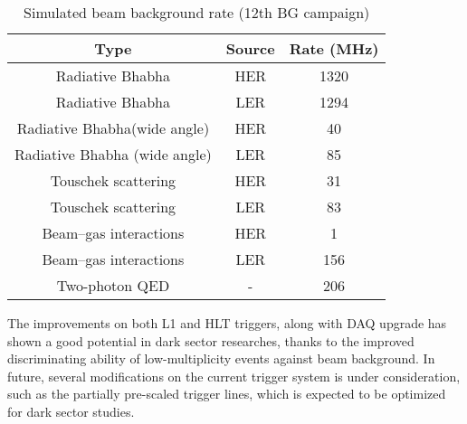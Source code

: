 \begin{table}[htbp]
	\centering
	\large
	\caption{Simulated beam background rate (12th BG campaign)\cite{b2book}}
	\label{tab:BG}
	\begin{tabular}{c c c}
		\toprule
		Type & Source & Rate (MHz)\\
		\hline
		Radiative Bhabha & HER &  1320\\
		Radiative Bhabha & LER &  1294\\
		Radiative Bhabha(wide angle) & HER &  40\\
		Radiative Bhabha (wide angle) & LER &  85\\
		Touschek scattering & HER &  31\\
		Touschek scattering & LER &  83\\
		Beam–gas interactions & HER &  1\\
		Beam–gas interactions & LER &  156\\
		Two-photon QED & - & 206\\
		\bottomrule
	\end{tabular}
\end{table}

The improvements on both L1 and HLT triggers, along with DAQ upgrade has shown a good potential in dark sector researches\cite{de2018first}\cite{macqueen2020dark}, thanks to the improved discriminating ability of low-multiplicity events against beam background. In future, several modifications on the current trigger system is under consideration, such as the partially pre-scaled trigger lines, which is expected to be optimized for dark sector studies\cite{b2book}. 


\begin{comment}
Based on the reasons discussed above, Belle II trigger has been designed to have 2 separated levels of triggers. Low level trigger, also called as L1 trigger, is hardware-based trigger. and high level trigger (HLT) is the software based trigger.
The L1 trigger rate can go up to 30kHz that is also the up-limit of DAQ read-in rate. The latency of L1 is control to be 5 $\mu$s, improved from Belle trigger.
And yet 30kHz is still to high for writing out the data to tape, so the HLT must be implemented to reduce the trigger rate to about 10kHz and it has to be able to select ROI on the PXD to reduce the data flux limited by bandwidth of read-out cables. To do that, HLT utilize  the full offline reconstruction algorithms to allow the access of full-granularity
event reconstruction using all detectors except for the PXD. 

\end{comment}

